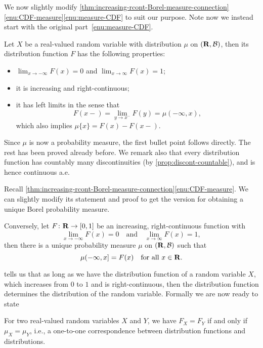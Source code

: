 We now slightly modify \cref{thm:increasing-rcont-Borel-measure-connection}\ref{enu:CDF-measure}\ref{enu:measure-CDF} to suit our purpose. Note now we instead start with the original part~\ref{enu:measure-CDF}.
\begin{thm} \label{thm:measure-CDF-prob}
    Let $X$ be a real-valued random variable with distribution $\mu$ on $(\mathbf{R},\mathcal{B})$, then its distribution function $F$ has the following properties:
        \begin{itemize}
            \item $\lim_{x \to -\infty} F(x) = 0$ and $\lim_{x \to \infty} F(x) = 1$;
            \item it is increasing and right-continuous; 
            \item it has left limits in the sense that \[
                F(x-) = \lim_{y \to x^-} F(y) = \mu(-\infty,x),
            \] which also implies $\mu\{x\} = F(x) - F(x-)$.
        \end{itemize}
\end{thm}
Since $\mu$ is now a probability measure, the first bullet point follows directly. The rest has been proved already before. We remark also that every distribution function has countably many discontinuities (by \cref{prop:discont-countable}), and is hence continuous a.e.

Recall \cref{thm:increasing-rcont-Borel-measure-connection}\ref{enu:CDF-measure}. We can slightly modify its statement and proof to get the version for obtaining a unique Borel probability measure.

\begin{thm} \label{thm:CDF-measure-prob}
    Conversely, let $F\colon \mathbf{R}\to [0,1]$ be an increasing, right-continuous function with \[
        \lim_{x \to -\infty} F(x) = 0\quad \text{and} \quad \lim_{x \to \infty} F(x) = 1,
    \] then there is a unique probability measure $\mu$ on $(\mathbf{R},\mathcal{B})$ such that \[
        \mu(-\infty,x] = F(x) \quad \text{for all }x\in \mathbf{R}.
    \]
\end{thm}

 tells us that as long as we have the distribution function of a random variable $X$, which increases from $0$ to $1$ and is right-continuous, then the distribution function determines the distribution of the random variable. Formally we are now ready to state 
\begin{cor} \label{cor:dist-cdf-equiv}
    For two real-valued random variables $X$ and $Y$, we have $F_X = F_Y$ if and only if $\mu_X = \mu_Y$, i.e., a one-to-one correspondence between distribution functions and distributions.
\end{cor}

